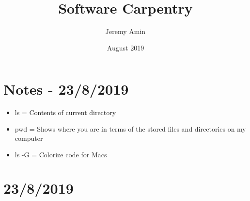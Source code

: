 \documentclass{article}
\title{Software Carpentry}
\author{Jeremy Amin}
\date{August 2019}
\begin{document}
\maketitle

\section{Notes - 23/8/2019}

\begin{itemize}
    \item ls = Contents of current directory
    \item pwd = Shows where you are in terms of the stored files and directories on my computer
    \item ls -G = Colorize code for Macs
\end{itemize}

\section{23/8/2019}
\end{document}
